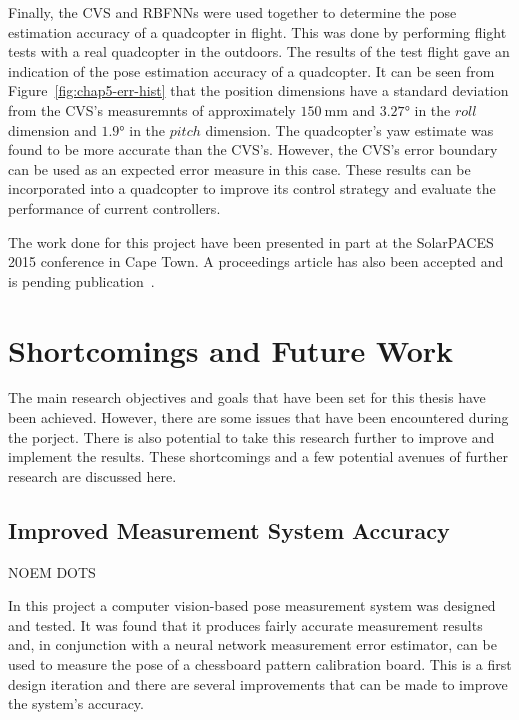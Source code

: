 Finally, the CVS and RBFNNs were used together to determine the pose estimation accuracy of a quadcopter in flight. This was done by performing flight tests with a real quadcopter in the outdoors. The results of the test flight gave an indication of the pose estimation accuracy of a quadcopter. It can be seen from Figure~\ref{fig:chap5-err-hist} that the position dimensions have a standard deviation from the CVS's measuremnts of approximately $\SI{150}{\mm}$ and $\ang{3.27}$ in the $roll$ dimension and $\ang{1.9}$ in the $pitch$ dimension. The quadcopter's yaw estimate was found to be more accurate than the CVS's. However, the CVS's error boundary can be used as an expected error measure in this case. These results can be incorporated into a quadcopter to improve its control strategy and evaluate the performance of current controllers. 


The work done for this project have been presented in part at the SolarPACES 2015 conference in Cape Town. A proceedings article has also been accepted and is pending publication~\citep{lock2015}. 

\section{Shortcomings and Future Work}

The main research objectives and goals that have been set for this thesis have been achieved. However, there are some issues that have been encountered during the porject. There is also potential to take this research further to improve and implement the results. These shortcomings and a few potential avenues of further research are discussed here. 

\subsection{Improved Measurement System Accuracy}
NOEM DOTS

In this project a computer vision-based pose measurement system was designed and tested. It was found that it produces fairly accurate measurement results and, in conjunction with a neural network measurement error estimator, can be used to measure the pose of a chessboard pattern calibration board. This is a first design iteration and there are several improvements that can be made to improve the system's accuracy. 

